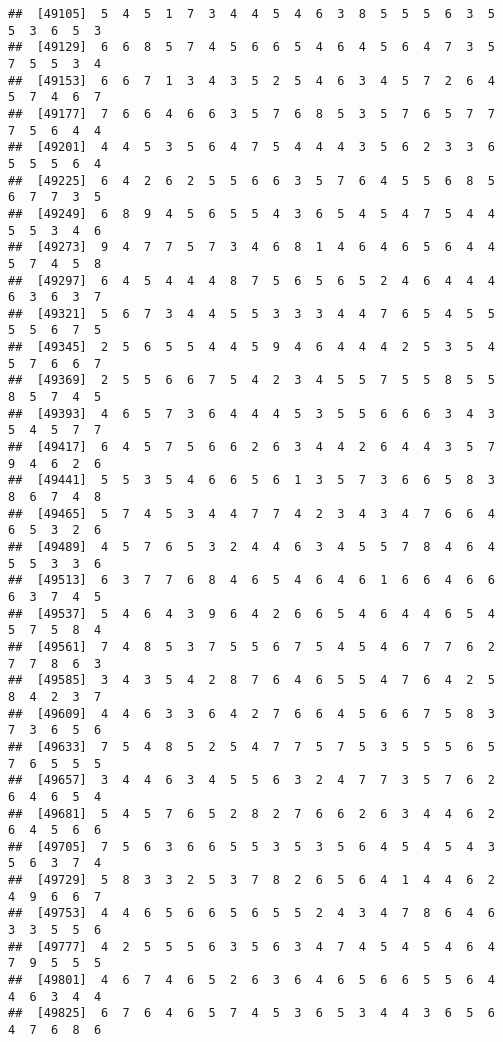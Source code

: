 \documentclass[
]{book}
\begin{document}
\begin{verbatim}
##  [49105]  5  4  5  1  7  3  4  4  5  4  6  3  8  5  5  5  6  3  5  5  3  6  5  3
##  [49129]  6  6  8  5  7  4  5  6  6  5  4  6  4  5  6  4  7  3  5  7  5  5  3  4
##  [49153]  6  6  7  1  3  4  3  5  2  5  4  6  3  4  5  7  2  6  4  5  7  4  6  7
##  [49177]  7  6  6  4  6  6  3  5  7  6  8  5  3  5  7  6  5  7  7  7  5  6  4  4
##  [49201]  4  4  5  3  5  6  4  7  5  4  4  4  3  5  6  2  3  3  6  5  5  5  6  4
##  [49225]  6  4  2  6  2  5  5  6  6  3  5  7  6  4  5  5  6  8  5  6  7  7  3  5
##  [49249]  6  8  9  4  5  6  5  5  4  3  6  5  4  5  4  7  5  4  4  5  5  3  4  6
##  [49273]  9  4  7  7  5  7  3  4  6  8  1  4  6  4  6  5  6  4  4  5  7  4  5  8
##  [49297]  6  4  5  4  4  4  8  7  5  6  5  6  5  2  4  6  4  4  4  6  3  6  3  7
##  [49321]  5  6  7  3  4  4  5  5  3  3  3  4  4  7  6  5  4  5  5  5  5  6  7  5
##  [49345]  2  5  6  5  5  4  4  5  9  4  6  4  4  4  2  5  3  5  4  5  7  6  6  7
##  [49369]  2  5  5  6  6  7  5  4  2  3  4  5  5  7  5  5  8  5  5  8  5  7  4  5
##  [49393]  4  6  5  7  3  6  4  4  4  5  3  5  5  6  6  6  3  4  3  5  4  5  7  7
##  [49417]  6  4  5  7  5  6  6  2  6  3  4  4  2  6  4  4  3  5  7  9  4  6  2  6
##  [49441]  5  5  3  5  4  6  6  5  6  1  3  5  7  3  6  6  5  8  3  8  6  7  4  8
##  [49465]  5  7  4  5  3  4  4  7  7  4  2  3  4  3  4  7  6  6  4  6  5  3  2  6
##  [49489]  4  5  7  6  5  3  2  4  4  6  3  4  5  5  7  8  4  6  4  5  5  3  3  6
##  [49513]  6  3  7  7  6  8  4  6  5  4  6  4  6  1  6  6  4  6  6  6  3  7  4  5
##  [49537]  5  4  6  4  3  9  6  4  2  6  6  5  4  6  4  4  6  5  4  5  7  5  8  4
##  [49561]  7  4  8  5  3  7  5  5  6  7  5  4  5  4  6  7  7  6  2  7  7  8  6  3
##  [49585]  3  4  3  5  4  2  8  7  6  4  6  5  5  4  7  6  4  2  5  8  4  2  3  7
##  [49609]  4  4  6  3  3  6  4  2  7  6  6  4  5  6  6  7  5  8  3  7  3  6  5  6
##  [49633]  7  5  4  8  5  2  5  4  7  7  5  7  5  3  5  5  5  6  5  7  6  5  5  5
##  [49657]  3  4  4  6  3  4  5  5  6  3  2  4  7  7  3  5  7  6  2  6  4  6  5  4
##  [49681]  5  4  5  7  6  5  2  8  2  7  6  6  2  6  3  4  4  6  2  6  4  5  6  6
##  [49705]  7  5  6  3  6  6  5  5  3  5  3  5  6  4  5  4  5  4  3  5  6  3  7  4
##  [49729]  5  8  3  3  2  5  3  7  8  2  6  5  6  4  1  4  4  6  2  4  9  6  6  7
##  [49753]  4  4  6  5  6  6  5  6  5  5  2  4  3  4  7  8  6  4  6  3  3  5  5  6
##  [49777]  4  2  5  5  5  6  3  5  6  3  4  7  4  5  4  5  4  6  4  7  9  5  5  5
##  [49801]  4  6  7  4  6  5  2  6  3  6  4  6  5  6  6  5  5  6  4  4  6  3  4  4
##  [49825]  6  7  6  4  6  5  7  4  5  3  6  5  3  4  4  3  6  5  6  4  7  6  8  6

\end{verbatim}
\end{document}
